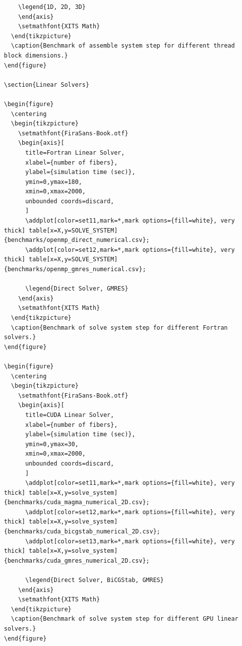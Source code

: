 \documentclass[a4paper,11pt]{kth-mag}
\begin{document}
\begin{listing}
\begin{verbatim}
    \legend{1D, 2D, 3D}
    \end{axis}
    \setmathfont{XITS Math}
  \end{tikzpicture}
  \caption{Benchmark of assemble system step for different thread block dimensions.}
\end{figure}

\section{Linear Solvers}

\begin{figure}
  \centering
  \begin{tikzpicture}
    \setmathfont{FiraSans-Book.otf}
    \begin{axis}[
      title=Fortran Linear Solver,
      xlabel={number of fibers},
      ylabel={simulation time (sec)},
      ymin=0,ymax=180,
      xmin=0,xmax=2000,
      unbounded coords=discard,
      ]
      \addplot[color=set11,mark=*,mark options={fill=white}, very thick] table[x=X,y=SOLVE_SYSTEM] {benchmarks/openmp_direct_numerical.csv};
      \addplot[color=set12,mark=*,mark options={fill=white}, very thick] table[x=X,y=SOLVE_SYSTEM] {benchmarks/openmp_gmres_numerical.csv};

      \legend{Direct Solver, GMRES}
    \end{axis}
    \setmathfont{XITS Math}
  \end{tikzpicture}
  \caption{Benchmark of solve system step for different Fortran solvers.}
\end{figure}

\begin{figure}
  \centering
  \begin{tikzpicture}
    \setmathfont{FiraSans-Book.otf}
    \begin{axis}[
      title=CUDA Linear Solver,
      xlabel={number of fibers},
      ylabel={simulation time (sec)},
      ymin=0,ymax=30,
      xmin=0,xmax=2000,
      unbounded coords=discard,
      ]
      \addplot[color=set11,mark=*,mark options={fill=white}, very thick] table[x=X,y=solve_system] {benchmarks/cuda_magma_numerical_2D.csv};
      \addplot[color=set12,mark=*,mark options={fill=white}, very thick] table[x=X,y=solve_system] {benchmarks/cuda_bicgstab_numerical_2D.csv};
      \addplot[color=set13,mark=*,mark options={fill=white}, very thick] table[x=X,y=solve_system] {benchmarks/cuda_gmres_numerical_2D.csv};

      \legend{Direct Solver, BiCGStab, GMRES}
    \end{axis}
    \setmathfont{XITS Math}
  \end{tikzpicture}
  \caption{Benchmark of solve system step for different GPU linear solvers.}
\end{figure}


\end{verbatim}
\end{listing}
\end{document}
